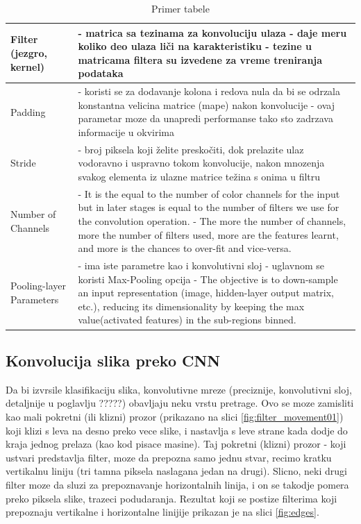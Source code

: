 \documentclass[a4paper]{article}
\begin{document}
\begin{table}[h!]
\begin{center}
\caption{Primer tabele}
\begin{tabular}{|l|p{60mm}|}
\hline
Filter (jezgro, kernel) &
- matrica sa tezinama za konvoluciju ulaza \newline
- daje meru koliko deo ulaza liči na karakteristiku \newline
- tezine u matricama filtera su izvedene za vreme treniranja podataka
\\
\hline
Padding &
- koristi se za dodavanje kolona i redova nula da bi se odrzala konstantna velicina matrice (mape) nakon konvolucije \newline
- ovaj parametar moze da unapredi performanse tako sto zadrzava informacije u okvirima
\\
\hline 
Stride &
- broj piksela koji želite preskočiti, dok prelazite ulaz vodoravno i uspravno tokom konvolucije, nakon mnozenja svakog elementa iz ulazne matrice težina s onima u filtru
\\
\hline 
Number of Channels &
- It is the equal to the number of color channels for the input but in later stages is equal to the number of filters we use for the convolution operation. \newline
- The more the number of channels, more the number of filters used, more are the features learnt, and more is the chances to over-fit and vice-versa.
\\
\hline 
Pooling-layer Parameters &
- ima iste parametre kao i konvolutivni sloj \newline
- uglavnom se koristi Max-Pooling opcija \newline
- The objective is to down-sample an input representation (image, hidden-layer output matrix, etc.), reducing its dimensionality by keeping the max value(activated features) in the sub-regions binned.
\\
\hline 
\end{tabular}
\label{tabela_parametri}
\end{center}
\end{table}


\subsection{Konvolucija slika preko CNN}


Da bi izvrsile klasifikaciju slika, konvolutivne mreze (preciznije, konvolutivni sloj, detaljnije u poglavlju ?????) obavljaju neku vrstu pretrage. Ovo se moze zamisliti kao mali pokretni (ili klizni) prozor (prikazano na slici \ref{fig:filter_movement01}) koji klizi s leva na desno preko vece slike, i nastavlja s leve strane kada dodje do kraja jednog prelaza (kao kod pisace masine). Taj pokretni (klizni) prozor - koji ustvari predstavlja filter, moze da prepozna samo jednu stvar, recimo kratku vertikalnu liniju (tri tamna piksela naslagana jedan na drugi). Slicno, neki drugi filter moze da sluzi za prepoznavanje horizontalnih linija, i on se takodje pomera preko piksela slike, trazeci podudaranja. Rezultat koji se postize filterima koji prepoznaju vertikalne i horizontalne linijije prikazan je na slici \ref{fig:edges}.
\end{document}
